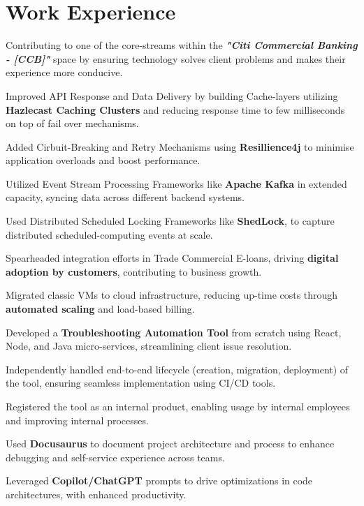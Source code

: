 \documentclass[]{divine-waters-resume}
\begin{document}
\begin{minipage}[t]{0.66\textwidth}


\section{Work Experience}
\vspace{\topsep}
\begin{tightemize}
\item Contributing to one of the core-streams within 
the \textbf{\textit{"Citi Commercial Banking - [CCB]"}} space by ensuring technology solves client problems and makes their experience more conducive.
\item Improved API Response and Data Delivery by building Cache-layers utilizing \textbf{Hazlecast Caching Clusters} and reducing response time to few milliseconds on top of fail over mechanisms.
\item Added Cirbuit-Breaking and Retry Mechanisms using \textbf{Resillience4j} to minimise application overloads and boost performance.
\item Utilized Event Stream Processing Frameworks like \textbf{Apache Kafka} in extended capacity, syncing data across different backend systems.
\item Used Distributed Scheduled Locking Frameworks like \textbf{ShedLock}, to capture distributed scheduled-computing events at scale.
\item Spearheaded integration efforts in Trade Commercial E-loans, driving \textbf{digital adoption by customers}, contributing to business growth.
\item Migrated classic VMs to cloud infrastructure, reducing up-time costs through \textbf{automated scaling} and load-based billing.
\item Developed a \textbf{Troubleshooting Automation Tool} from scratch using React, Node, and Java micro-services, streamlining client issue resolution.
\item Independently handled end-to-end lifecycle (creation, migration, deployment) of the tool, ensuring seamless implementation using CI/CD tools.
\item Registered the tool as an internal product, enabling usage by internal employees and improving internal processes.
\item Used \textbf{Docusaurus} to document project architecture and process to enhance debugging and self-service experience across teams.
\item Leveraged \textbf{Copilot/ChatGPT} prompts to drive optimizations in code architectures, with enhanced productivity.
\end{tightemize}


\end{minipage}
\end{document}
